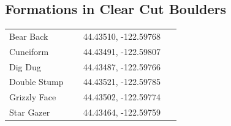 \begin{flushleft}
\subsection{Formations in Clear Cut Boulders}
\begin{center}
\begin{supertabular}{p{0.38\linewidth}p{0.5\linewidth}}
Bear Back & 44.43510, -122.59768 \\
Cuneiform & 44.43491, -122.59807 \\
Dig Dug & 44.43487, -122.59766 \\
Double Stump & 44.43521, -122.59785 \\
Grizzly Face & 44.43502, -122.59774 \\
Star Gazer & 44.43464, -122.59759 \\
\end{supertabular}
\end{center}

\end{flushleft}

